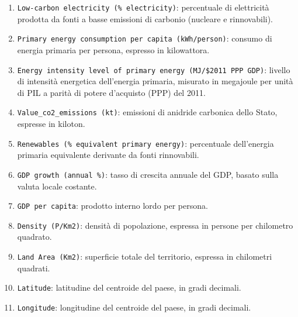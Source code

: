 \begin{enumerate}
    \item \texttt{Low-carbon electricity (\% electricity)}: percentuale di elettricità prodotta da fonti a basse emissioni di carbonio (nucleare e rinnovabili).
    \item \texttt{Primary energy consumption per capita (kWh/person)}: consumo di energia primaria per persona, espresso in kilowattora.
    \item \texttt{Energy intensity level of primary energy (MJ/\$2011 PPP GDP)}: livello di intensità energetica dell'energia primaria, misurato in megajoule per unità di PIL a parità di potere d'acquisto (PPP) del 2011.
    \item \texttt{Value\_co2\_emissions (kt)}: emissioni di anidride carbonica dello Stato, espresse in kiloton.
    \item \texttt{Renewables (\% equivalent primary energy)}: percentuale dell'energia primaria equivalente derivante da fonti rinnovabili.
    \item \texttt{GDP growth (annual \%)}: tasso di crescita annuale del GDP, basato sulla valuta locale costante.
    \item \texttt{GDP per capita}: prodotto interno lordo per persona.
    \item \texttt{Density (P/Km2)}: densità di popolazione, espressa in persone per chilometro quadrato.
    \item \texttt{Land Area (Km2)}: superficie totale del territorio, espressa in chilometri quadrati.
    \item \texttt{Latitude}: latitudine del centroide del paese, in gradi decimali.
    \item \texttt{Longitude}: longitudine del centroide del paese, in gradi decimali.
\end{enumerate}


